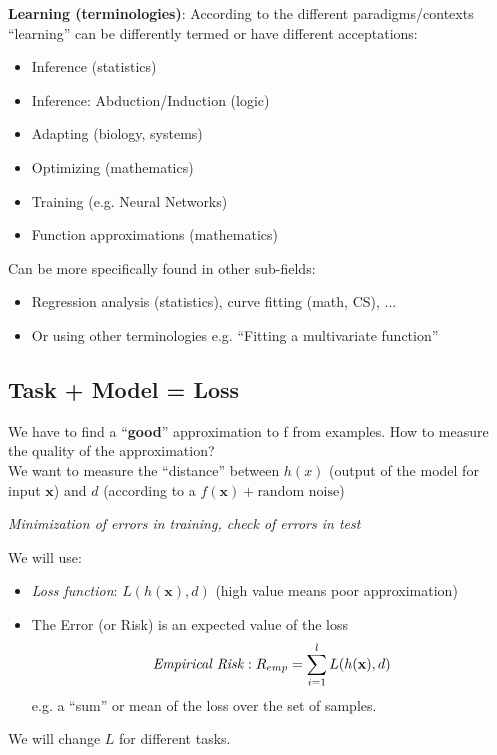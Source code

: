\documentclass[../main.tex]{subfiles}
\begin{document}
\noindent \textbf{Learning (terminologies)}:
According to the different paradigms/contexts “learning” can be differently termed or have different acceptations:
\begin{itemize}
    \item Inference (statistics)
    \item Inference: Abduction/Induction (logic)
    \item Adapting (biology, systems)
    \item Optimizing (mathematics)
    \item Training (e.g. Neural Networks)
    \item Function approximations (mathematics)
\end{itemize}

\noindent Can be more specifically found in other sub-fields:
\begin{itemize}
    \item Regression analysis (statistics), curve fitting (math, CS), ...
    \item Or using other terminologies e.g. “Fitting a multivariate function”
\end{itemize}

\subsection{Task + Model = Loss}
We have to find a  “\textbf{good}” approximation to f from examples. How to measure the quality of the approximation?\\

\noindent We want to measure the “distance” between $h(x)$ (output of the model for input $\mathbf{x}$) and $d$ (according to a $f(\mathbf{x}) + \text{random noise}$)\\
\begin{center}
\textit{Minimization of errors in training, check of errors in test}\\
\end{center}
\noindent We will use:
\begin{itemize}
    \item \emph{Loss function}: $L(h(\textbf{x}),d)$ (high value means poor approximation)
    \item The Error (or Risk) is an expected value of the loss\\
    $$\text{\emph{Empirical Risk}}: R_{emp}=\sum_{i=1}^{l} L(h(\textbf{x}),d)$$
    e.g. a “sum” or mean of the loss over the set of samples.
\end{itemize}
We will change $L$ for different tasks.\\
\end{document}
